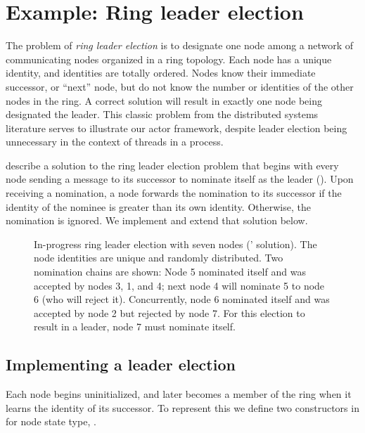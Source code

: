 \documentclass[sigplan,screen]{acmart}
\begin{document}
\section{Example: Ring leader election}
\label{sec:ring-impl}

The problem of \emph{ring leader election} is to designate one node
among a network of communicating nodes organized in a ring topology.
%
Each node has a unique identity, and identities are totally ordered.
%
Nodes know their immediate successor, or ``next'' node, but do not know the
number or identities of the other nodes in the ring.
%
A correct solution will result in exactly one node being designated the leader.
%
This classic problem from the distributed
systems literature serves to illustrate our actor framework,
despite leader election being unnecessary in the context of threads in a process.

\citet{chang1979decentralextrema} describe a solution to the ring leader election problem that begins with every
node sending a message to its successor to nominate itself as the leader
().
%
Upon receiving a nomination,
a node forwards the nomination to its successor
if the identity of the nominee is
greater than its own identity.
%
Otherwise, the nomination is ignored.
%
We implement and extend that solution below.

\begin{figure}

\caption{
    In-progress ring leader election with seven nodes
    (\citeauthor{chang1979decentralextrema}'
    \citeyear{chang1979decentralextrema} solution).
    The node identities are unique and randomly distributed.
    Two nomination chains are shown:
    Node 5 nominated itself and was accepted by nodes 3, 1, and 4; next node 4
    will nominate 5 to node 6 (who will reject it).
    Concurrently, node 6 nominated itself and was accepted by node 2 but
    rejected by node 7.
    For this election to result in a leader, node 7 must nominate itself.
}
\label{fig:ring-election-visual}
\end{figure}

\subsection{Implementing a leader election}




Each node begins uninitialized, and later becomes a member of the ring when
it learns the identity of its successor.
%
To represent this we define two constructors in  for node
state type, .
\end{document}
